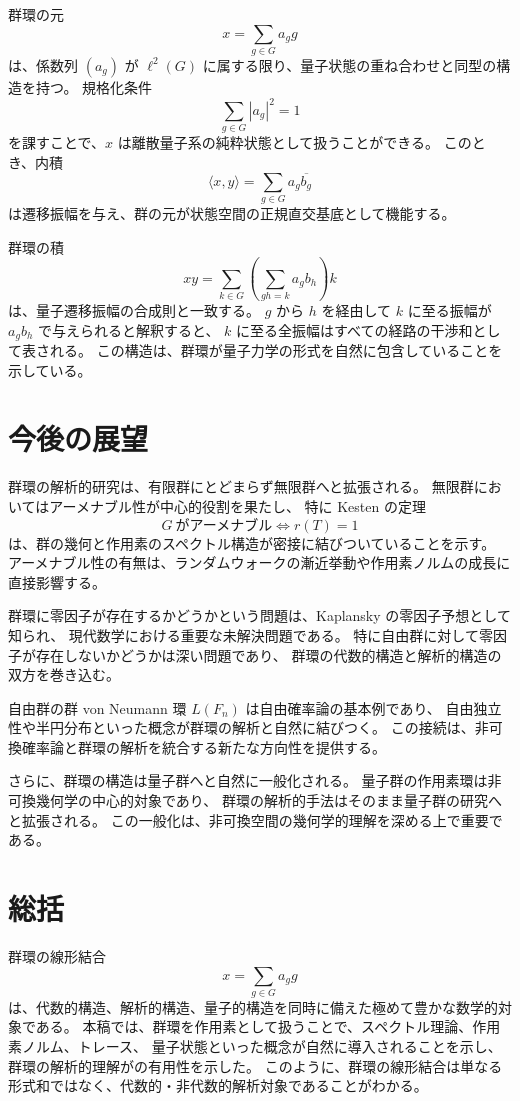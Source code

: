 \documentclass[12pt,a4paper]{ltjarticle}
\theoremstyle{definition}
\begin{document}
群環の元
\[
x=\sum_{g\in G}a_g g
\]
は、係数列 $(a_g)$ が $\ell^2(G)$ に属する限り、量子状態の重ね合わせと同型の構造を持つ。
規格化条件
\[
\sum_{g\in G}|a_g|^2=1
\]
を課すことで、$x$ は離散量子系の純粋状態として扱うことができる。
このとき、内積
\[
\langle x,y\rangle=\sum_{g\in G}a_g\overline{b_g}
\]
は遷移振幅を与え、群の元が状態空間の正規直交基底として機能する。

群環の積
\[
xy=\sum_{k\in G}\left(\sum_{gh=k}a_g b_h\right)k
\]
は、量子遷移振幅の合成則と一致する。
$g$ から $h$ を経由して $k$ に至る振幅が $a_g b_h$ で与えられると解釈すると、
$k$ に至る全振幅はすべての経路の干渉和として表される。
この構造は、群環が量子力学の形式を自然に包含していることを示している。

\section{今後の展望}

群環の解析的研究は、有限群にとどまらず無限群へと拡張される。
無限群においてはアーメナブル性が中心的役割を果たし、
特に Kesten の定理
\[
G\ \text{がアーメナブル} \iff r(T)=1
\]
は、群の幾何と作用素のスペクトル構造が密接に結びついていることを示す。
アーメナブル性の有無は、ランダムウォークの漸近挙動や作用素ノルムの成長に直接影響する。

群環に零因子が存在するかどうかという問題は、Kaplansky の零因子予想として知られ、
現代数学における重要な未解決問題である。
特に自由群に対して零因子が存在しないかどうかは深い問題であり、
群環の代数的構造と解析的構造の双方を巻き込む。

自由群の群 von Neumann 環 $L(F_n)$ は自由確率論の基本例であり、
自由独立性や半円分布といった概念が群環の解析と自然に結びつく。
この接続は、非可換確率論と群環の解析を統合する新たな方向性を提供する。

さらに、群環の構造は量子群へと自然に一般化される。
量子群の作用素環は非可換幾何学の中心的対象であり、
群環の解析的手法はそのまま量子群の研究へと拡張される。
この一般化は、非可換空間の幾何学的理解を深める上で重要である。

\section{総括}

群環の線形結合
\[
x=\sum_{g\in G}a_g g
\]
は、代数的構造、解析的構造、量子的構造を同時に備えた極めて豊かな数学的対象である。
本稿では、群環を作用素として扱うことで、スペクトル理論、作用素ノルム、トレース、
量子状態といった概念が自然に導入されることを示し、
群環の解析的理解がの有用性を示した。
このように、群環の線形結合は単なる形式和ではなく、代数的・非代数的解析対象であることがわかる。
\end{document}
